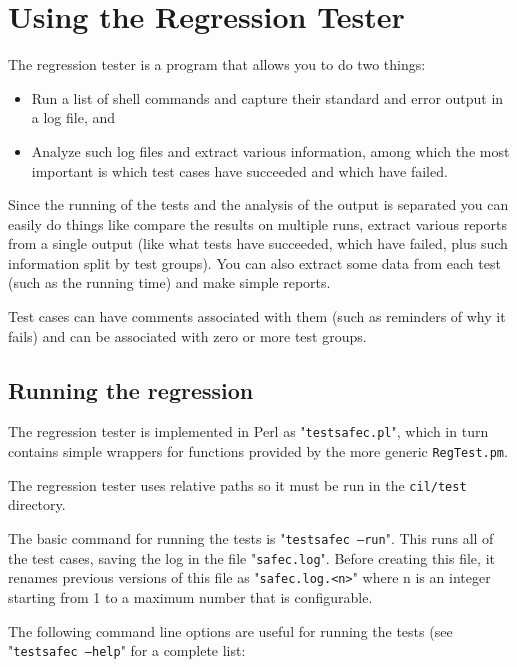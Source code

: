 \documentclass{book}
\def\t#1{{\tt #1}}
\begin{document}
\chapter{Using the Regression Tester}\label{ch-regtest}

 The regression tester is a program that allows you to do two things: 
\begin{itemize}
\item Run a list of shell commands and capture their standard and error output
 in a log file, and

\item Analyze such log files and extract various information, among which the
 most important is which test cases have succeeded and which have failed. 
\end{itemize}

 Since the running of the tests and the analysis of the output is separated
you can easily do things like compare the results on multiple runs, extract
various reports from a single output (like what tests have succeeded, which
have failed, plus such information split by test groups). You can also extract
some data from each test (such as the running time) and make simple reports. 

 Test cases can have comments associated with them (such as reminders of why
it fails) and can be associated with zero or more test groups.

 \section{Running the regression}

 The regression tester is implemented in Perl as "\t{testsafec.pl}", which in
turn contains simple wrappers for functions provided by the more generic
\t{RegTest.pm}.

 The regression tester uses relative paths so it must be run in the
 \t{cil/test} directory.

 The basic command for running the tests is "\t{testsafec --run}". This runs
all of the test cases, saving the log in the file "\t{safec.log}". Before
creating this file, it renames previous versions of this file as
"\t{safec.log.<n>}" where n is an integer starting from 1 to a maximum number
that is configurable.

 The following command line options are useful for running the tests (see
 "\t{testsafec --help}" for a complete list:
\end{document}
